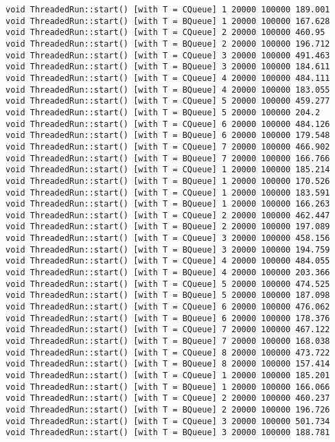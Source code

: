 \begin{verbatim}
void ThreadedRun::start() [with T = CQueue] 1 20000 100000 189.001
void ThreadedRun::start() [with T = BQueue] 1 20000 100000 167.628
void ThreadedRun::start() [with T = CQueue] 2 20000 100000 460.95
void ThreadedRun::start() [with T = BQueue] 2 20000 100000 196.712
void ThreadedRun::start() [with T = CQueue] 3 20000 100000 491.463
void ThreadedRun::start() [with T = BQueue] 3 20000 100000 184.611
void ThreadedRun::start() [with T = CQueue] 4 20000 100000 484.111
void ThreadedRun::start() [with T = BQueue] 4 20000 100000 183.055
void ThreadedRun::start() [with T = CQueue] 5 20000 100000 459.277
void ThreadedRun::start() [with T = BQueue] 5 20000 100000 204.2
void ThreadedRun::start() [with T = CQueue] 6 20000 100000 484.126
void ThreadedRun::start() [with T = BQueue] 6 20000 100000 179.548
void ThreadedRun::start() [with T = CQueue] 7 20000 100000 466.902
void ThreadedRun::start() [with T = BQueue] 7 20000 100000 166.766
void ThreadedRun::start() [with T = CQueue] 1 20000 100000 185.214
void ThreadedRun::start() [with T = BQueue] 1 20000 100000 170.526
void ThreadedRun::start() [with T = CQueue] 1 20000 100000 183.591
void ThreadedRun::start() [with T = BQueue] 1 20000 100000 166.263
void ThreadedRun::start() [with T = CQueue] 2 20000 100000 462.447
void ThreadedRun::start() [with T = BQueue] 2 20000 100000 197.089
void ThreadedRun::start() [with T = CQueue] 3 20000 100000 458.156
void ThreadedRun::start() [with T = BQueue] 3 20000 100000 194.759
void ThreadedRun::start() [with T = CQueue] 4 20000 100000 484.055
void ThreadedRun::start() [with T = BQueue] 4 20000 100000 203.366
void ThreadedRun::start() [with T = CQueue] 5 20000 100000 474.525
void ThreadedRun::start() [with T = BQueue] 5 20000 100000 187.098
void ThreadedRun::start() [with T = CQueue] 6 20000 100000 476.062
void ThreadedRun::start() [with T = BQueue] 6 20000 100000 178.376
void ThreadedRun::start() [with T = CQueue] 7 20000 100000 467.122
void ThreadedRun::start() [with T = BQueue] 7 20000 100000 168.038
void ThreadedRun::start() [with T = CQueue] 8 20000 100000 473.722
void ThreadedRun::start() [with T = BQueue] 8 20000 100000 157.414
void ThreadedRun::start() [with T = CQueue] 1 20000 100000 185.201
void ThreadedRun::start() [with T = BQueue] 1 20000 100000 166.066
void ThreadedRun::start() [with T = CQueue] 2 20000 100000 460.237
void ThreadedRun::start() [with T = BQueue] 2 20000 100000 196.726
void ThreadedRun::start() [with T = CQueue] 3 20000 100000 501.734
void ThreadedRun::start() [with T = BQueue] 3 20000 100000 188.781

\end{verbatim}
